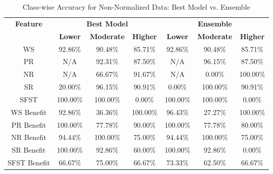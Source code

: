 \begin{table}[H]
\centering
\begin{tabular}{|c|c|c|c|c|c|c|}
\hline
\multirow{2}{*}{\textbf{Feature}} & \multicolumn{3}{c|}{\textbf{Best Model}} & \multicolumn{3}{c|}{\textbf{Ensemble}} \\
\cline{2-7}
 & \textbf{Lower} & \textbf{Moderate} & \textbf{Higher} & \textbf{Lower} & \textbf{Moderate} & \textbf{Higher} \\
\hline
WS & 92.86\% & 90.48\% & 85.71\% & 92.86\% & 90.48\% & 85.71\% \\
\hline
PR & N/A & 92.31\% & 87.50\% & N/A & 96.15\% & 87.50\% \\
\hline
NR & N/A & 66.67\% & 91.67\% & N/A & 0.00\% & 100.00\% \\
\hline
SR & 20.00\% & 96.15\% & 90.91\% & 0.00\% & 100.00\% & 90.91\% \\
\hline
SFST & 100.00\% & 100.00\% & 0.00\% & 100.00\% & 100.00\% & 0.00\% \\
\hline
WS Benefit & 92.86\% & 36.36\% & 100.00\% & 96.43\% & 27.27\% & 100.00\% \\
\hline
PR Benefit & 100.00\% & 77.78\% & 90.00\% & 100.00\% & 77.78\% & 80.00\% \\
\hline
NR Benefit & 94.44\% & 100.00\% & 75.00\% & 94.44\% & 100.00\% & 75.00\% \\
\hline
SR Benefit & 100.00\% & 92.86\% & 60.00\% & 100.00\% & 92.86\% & 0.00\% \\
\hline
SFST Benefit & 66.67\% & 75.00\% & 66.67\% & 73.33\% & 62.50\% & 66.67\% \\
\hline
\end{tabular}
\caption{Class-wise Accuracy for Non-Normalized Data: Best Model vs. Ensemble}
\label{reg_spec_tab:non_norm_accuracy}
\end{table}
